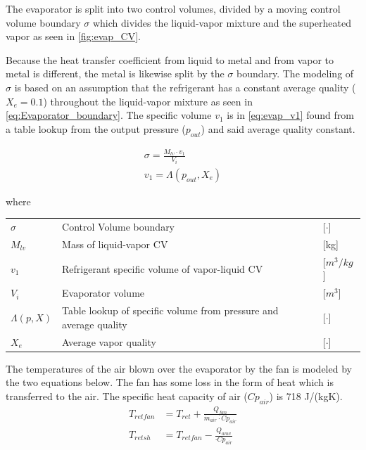 The evaporator is split into two control volumes, divided by a moving control volume boundary $\sigma$ which divides the liquid-vapor mixture and the superheated vapor as seen in \cref{fig:evap_CV}.

Because the heat transfer coefficient from liquid to metal and from vapor to metal is different, the metal is likewise split by the $\sigma$ boundary. The modeling of $\sigma$ is based on an assumption that the refrigerant has a constant average quality ($X_e = 0.1$) throughout the liquid-vapor mixture as seen in \cref{eq:Evaporator_boundary}. The specific volume $v_1$ is in \cref{eq:evap_v1} found from a table lookup from the output pressure ($p_{out}$) and said average quality constant.

\begin{align}
	\sigma = \frac{M_{lv} \cdot v_1}{V_i} \label{eq:Evaporator_boundary} \\
	v_1 = \Lambda(p_{out},X_e) \label{eq:evap_v1}
\end{align}

where
\smallskip
\begin{center}
	\begin{tabular}{l p{10cm} l}
		$\sigma$       & Control Volume boundary                                           & [$\cdot$]            \\
		$M_{lv}$       & Mass of liquid-vapor CV                                           & [\si{kg}]            \\
		$v_1$          & Refrigerant specific volume of vapor-liquid CV                    & [$\si{m}^3/\si{kg}$] \\
		$V_i$          & Evaporator volume                                                 & [$\si{m}^3$]         \\
		$\Lambda(p,X)$ & Table lookup of specific volume from pressure and average quality & [$\cdot$] \\
		$ X_e $        & Average vapor quality                                             & [$\cdot$]
	\end{tabular}
\end{center}
\medskip
The temperatures of the air blown over the evaporator by the fan is modeled by the two equations below. The fan has some loss in the form of heat which is transferred to the air. The specific heat capacity of air ($Cp_{air}$) is 718 \si{J}/(\si{kg}\si{K}).
\begin{align}
	T_{retfan} 		& = T_{ret} + \frac{Q_{fan}}{\dot{m}_{air} \cdot Cp_{air}} 		\label{eq:T_retfan} 		\\
	T_{retsh} 		& = T_{retfan} - \frac{Q_{amv}}{ \cdot Cp_{air}} 	\label{eq:T_retsh}
\end{align}

